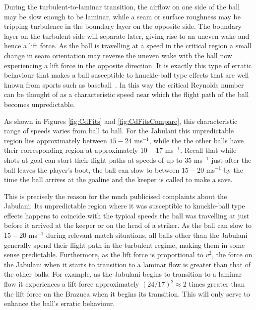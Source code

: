 \documentclass[a4paper]{article}
\begin{document}
During the turbulent-to-laminar transition, the airflow on one side of the ball may be slow enough to be laminar, while a seam or surface roughness may be tripping turbulence in the boundary layer on the opposite side.  The boundary layer on the turbulent side will separate later, giving rise to an uneven wake and hence a lift force.  As the ball is travelling at a speed in the critical region a small change in seam orientation may reverse the uneven wake with the ball now experiencing a lift force in the opposite direction.  It is exactly this type of erratic behaviour that makes a ball susceptible to knuckle-ball type effects that are well known from sports such as baseball~\cite{HongSetal, BaseballRef}. 
In this way the critical Reynolds number can be thought of as a characteristic speed near which the flight path of the ball becomes unpredictable.   

As shown in Figures \ref{fig:CdFits} and \ref{fig:CdFitsCompare}, this characteristic range of speeds varies from ball to ball.  For the Jabulani this unpredictable region lies approximately between $15 - 24$ ms$^{-1}$, while the the other balls have their corresponding region at approximately $10 - 17$ ms$^{-1}$.
Recall that while shots at goal can start their flight paths at speeds of up to $35$ ms$^{-1}$ just after the ball leaves the player's boot, the ball can slow to between $15 - 20$ ms$^{-1}$ by the time the ball arrives at the goaline and the keeper is called to make a save.  

This is precisely the reason for the much publicised complaints about the Jabulani.  Its unpredictable region where it was susceptible to knuckle-ball type effects happens to coincide with the typical speeds the ball was travelling at just before it arrived at the keeper or on the head of a striker.  As the ball can slow to $15 - 20$ ms$^{-1}$ during relevant match situations, all balls other than the Jabulani generally spend their flight path in the turbulent regime, making them in some sense predictable.  Furthermore, as the lift force is proportional to $v^2$, the force on the Jabulani when it starts to transition to a laminar flow is greater than that of the other balls.  For example, as the Jabulani begins to transition to a laminar flow it experiences a lift force approximately $({24}/{17})^2 \approx 2$ times greater than the lift force on the Brazuca when it begins its transition.  This will only serve to enhance the ball's erratic behaviour.
\end{document}
